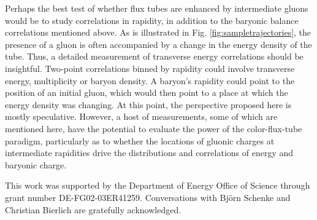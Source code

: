 \documentclass[aps, prc, 12pt, nofootinbib, showpacs, superscriptaddress, tightenlines, groupedaddress]{revtex4-2}
\begin{document}
Perhaps the best test of whether flux tubes are enhanced by intermediate gluons would be to study correlations in rapidity, in addition to the baryonic balance correlations mentioned above. As is illustrated in Fig. \ref{fig:sampletrajectories}, the presence of a gluon is often accompanied by a change in the energy density of the tube. Thus, a detailed measurement of transverse energy correlations should be insightful. Two-point correlations binned by rapidity could involve transverse energy, multiplicity or baryon density. A baryon's rapidity could point to the position of an initial gluon, which would then point to a place at which the energy density was changing. At this point, the perspective proposed here is mostly speculative. However, a host of measurements, some of which are mentioned here, have the potential to evaluate the power of the color-flux-tube paradigm, particularly as to whether the locations of gluonic charges at intermediate rapidities drive the distributions and correlations of energy and baryonic charge.

\begin{acknowledgments}
This work was supported by the Department of Energy Office of Science through grant number DE-FG02-03ER41259. Conversations with Bj\"orn Schenke and Christian Bierlich are gratefully acknowledged.
\end{acknowledgments}


\end{document}

